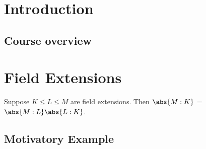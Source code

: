 \documentclass{article}
\begin{document}
\maketitle


\clearpage
\section{Introduction}

\subsection{Course overview}












\clearpage
\section{Field Extensions}\label{sec:1}









\begin{nthm}\label{thm:towerLaw}
    Suppose $K \leq L \leq M$ are field extensions. Then $\abs{M:K}$ = $\abs{M:L}\abs{L:K}$.
\end{nthm}










\subsection{Motivatory Example}\label{sec:motivEg}
\end{document}
